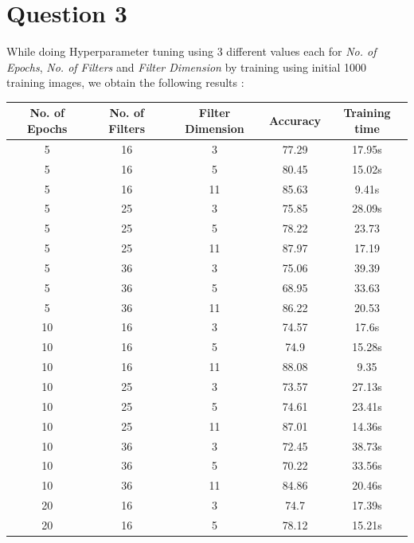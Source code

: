 \documentclass{article} %
\begin{document}
\section{Question 3}
While doing Hyperparameter tuning using 3 different values each for \textit{No. of Epochs}, \textit{No. of Filters} and \textit{Filter Dimension} by training using initial 1000 training images, we obtain the following results :
\begin{table}[H]
  \begin{center}
    \begin{tabular}{| c | c | c | c | c |} 
    \hline
      \textbf{No. of Epochs} & \textbf{No. of Filters} & \textbf{Filter Dimension} & \textbf{Accuracy} & \textbf{Training time}\\
      \hline
      5 & 16 & 3 & 77.29 & 17.95s\\
      \hline
      5 & 16 & 5 & 80.45 & 15.02s\\
      \hline
      5 & 16 & 11 & 85.63 & 9.41s\\
      \hline
      5 & 25 & 3 & 75.85 & 28.09s\\
      \hline
      5 & 25 & 5 & 78.22 & 23.73\\
      \hline
      5 & 25 & 11 & 87.97 & 17.19\\
      \hline
      5 & 36 & 3 & 75.06 & 39.39\\
      \hline
      5 & 36 & 5 & 68.95 & 33.63\\
      \hline
      5 & 36 & 11 & 86.22 & 20.53\\
      \hline %
      10 & 16 & 3 & 74.57 & 17.6s\\
      \hline
      10 & 16 & 5 & 74.9 & 15.28s\\
      \hline
      10 & 16 & 11 & 88.08 & 9.35\\
      \hline
      10 & 25 & 3 & 73.57 & 27.13s\\
      \hline
      10 & 25 & 5 & 74.61 & 23.41s\\
      \hline
      10 & 25 & 11 & 87.01 & 14.36s\\
      \hline
      10 & 36 & 3 & 72.45 & 38.73s\\
      \hline
      10 & 36 & 5 & 70.22 & 33.56s\\
      \hline
      10 & 36 & 11 & 84.86 & 20.46s\\
      \hline %
      20 & 16 & 3 & 74.7 &17.39s \\
      \hline
      20 & 16 & 5 & 78.12 & 15.21s\\

\end{tabular}
\end{center}
\end{table}
\end{document}
